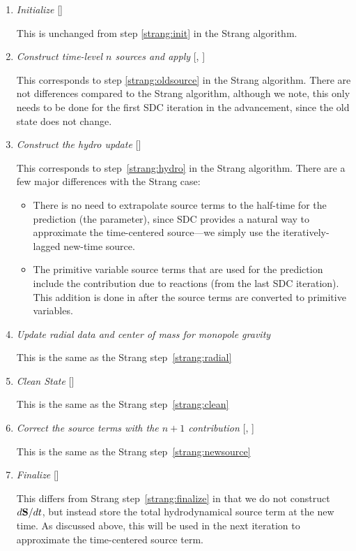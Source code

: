 \begin{enumerate}
\item {\em Initialize} []

This is unchanged from step \ref{strang:init} in the Strang algorithm.


\item {\em Construct time-level $n$ sources and apply} 
  [, ]

This corresponds to step \ref{strang:oldsource} in the Strang
algorithm.  There are not differences compared to the Strang
algorithm, although we note, this only needs to be done for the first
SDC iteration in the advancement, since the old state does not change.

\item {\em Construct the hydro update} []

This corresponds to step~\ref{strang:hydro} in the Strang
algorithm.  There are a few major differences with the Strang case:
\begin{itemize}
\item There is no need to extrapolate source terms to the half-time
  for the prediction (the 
  parameter), since SDC provides a natural way to approximate the
  time-centered source---we simply use the iteratively-lagged new-time
  source.

\item The primitive variable source terms that are used for the
  prediction include the contribution due to reactions (from the last
  SDC iteration).  This addition is done in
   after the source terms are
  converted to primitive variables.
\end{itemize}

\item {\em Update radial data and center of mass for monopole gravity}
  
  This is the same as the Strang step~\ref{strang:radial}


\item {\em Clean State} []

  This is the same as the Strang step~\ref{strang:clean}

\item \label{strang:newsource} {\em Correct the source terms with the $n+1$ contribution}
  [, ]

  This is the same as the Strang step~\ref{strang:newsource}

\item {\em Finalize} []

  This differs from Strang step~\ref{strang:finalize} in that we do not
  construct $d{\bf S}/dt$, but instead store the total hydrodynamical source
  term at the new time.  As discussed above, this will be used in the 
  next iteration to approximate the time-centered source term.

\end{enumerate}




